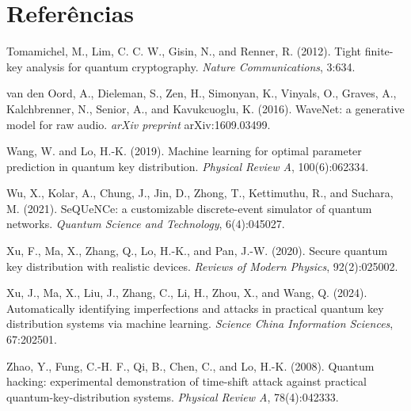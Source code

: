 \documentclass[12pt]{article}
\makeatletter
\renewenvironment{thebibliography}[1]{%
  \section*{Refer\^encias}%
  \list{}{\usecounter{enumiv}\let\p@enumiv\@empty%
    \renewcommand\theenumiv{\@arabic\c@enumiv}%
    \setlength{\labelwidth}{0pt}\setlength{\labelsep}{0pt}%
    \setlength{\leftmargin}{1.6em}\setlength{\itemindent}{-1.6em}%
    \setlength{\itemsep}{0.35em}\setlength{\parsep}{0pt}}%
  \small\sloppy\clubpenalty4000\widowpenalty4000%
  \let\@noitemerr\relax}%
 {\endlist}
\makeatother
\begin{document}
\begin{thebibliography}{99}
\bibitem{} Tomamichel, M., Lim, C. C. W., Gisin, N., and Renner, R. (2012). Tight
finite-key analysis for quantum cryptography. \textit{Nature Communications},
3:634.

\bibitem{} van den Oord, A., Dieleman, S., Zen, H., Simonyan, K., Vinyals, O.,
Graves, A., Kalchbrenner, N., Senior, A., and Kavukcuoglu, K. (2016). WaveNet: a
generative model for raw audio. \textit{arXiv preprint} arXiv:1609.03499.

\bibitem{} Wang, W. and Lo, H.-K. (2019). Machine learning for optimal parameter
prediction in quantum key distribution. \textit{Physical Review A},
100(6):062334.

\bibitem{} Wu, X., Kolar, A., Chung, J., Jin, D., Zhong, T., Kettimuthu, R., and
Suchara, M. (2021). SeQUeNCe: a customizable discrete-event simulator of quantum
networks. \textit{Quantum Science and Technology}, 6(4):045027.

\bibitem{} Xu, F., Ma, X., Zhang, Q., Lo, H.-K., and Pan, J.-W. (2020). Secure
quantum key distribution with realistic devices. \textit{Reviews of Modern
Physics}, 92(2):025002.

\bibitem{} Xu, J., Ma, X., Liu, J., Zhang, C., Li, H., Zhou, X., and Wang, Q.
(2024). Automatically identifying imperfections and attacks in practical quantum
key distribution systems via machine learning. \textit{Science China Information
Sciences}, 67:202501.

\bibitem{} Zhao, Y., Fung, C.-H. F., Qi, B., Chen, C., and Lo, H.-K. (2008).
Quantum hacking: experimental demonstration of time-shift attack against
practical quantum-key-distribution systems. \textit{Physical Review A},
78(4):042333.

\end{thebibliography}
\end{document}
